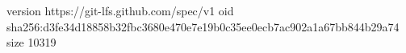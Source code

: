 version https://git-lfs.github.com/spec/v1
oid sha256:d3fe34d18858b32fbc3680e470e7e19b0c35ee0ecb7ac902a1a67bb844b29a74
size 10319
